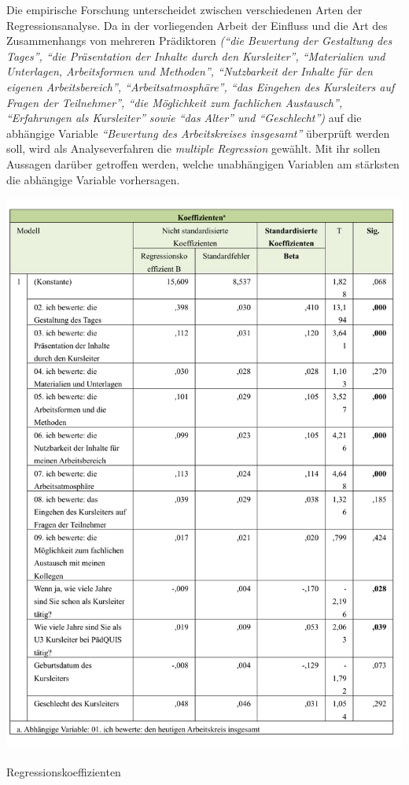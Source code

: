 \documentclass[12pt,a4paper]{article}
\begin{document}
Die empirische Forschung unterscheidet zwischen verschiedenen Arten der Regressionsanalyse. Da in der vorliegenden Arbeit der Einfluss und die Art des Zusammenhangs von mehreren Prädiktoren \textit{("`die Bewertung der Gestaltung des Tages"', "`die Präsentation der Inhalte durch den Kursleiter"', "`Materialien und Unterlagen, Arbeitsformen und Methoden"', "`Nutzbarkeit der Inhalte für den eigenen Arbeitsbereich"', "`Arbeitsatmosphäre"', "`das Eingehen des Kursleiters auf Fragen der Teilnehmer"', "`die Möglichkeit zum fachlichen Austausch"', "`Erfahrungen als Kursleiter"' sowie "`das Alter"' und "`Geschlecht"')} auf die abhängige Variable \textit{"`Bewertung des Arbeitskreises insgesamt"'} überprüft werden soll, wird als Analyseverfahren die \textit{multiple Regression} gewählt. Mit ihr sollen Aussagen darüber getroffen werden, welche unabhängigen Variablen am stärksten die abhängige Variable vorhersagen.


\begin{table}[!ht]
\includegraphics[scale=0.8]{tab08.pdf}
\caption{Regressionskoeffizienten}
\label{tab.4}
\end{table}
\FloatBarrier
\end{document}
